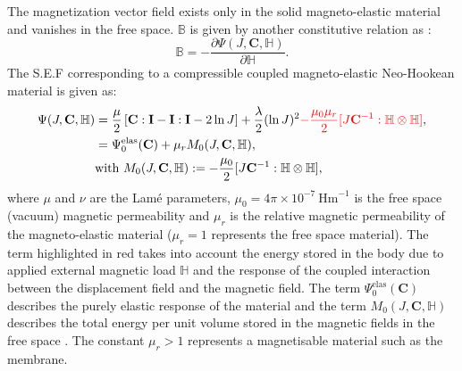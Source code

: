 \documentclass[11pt,a4paper,final]{article}
\begin{document}
The magnetization vector field exists only in the solid magneto-elastic material and vanishes in the free space. $\mathbb{B}$ is given by another constitutive relation as \cite{dorfmann2004}: 
\begin{equation}
\mathbb{B} = -\dfrac{\partial \Psi (J, \mathbf{C}, \mathbb{H})}{\partial \mathbb{H}}.
\label{eq:3.4}
\end{equation}
The S.E.F corresponding to a compressible coupled magneto-elastic Neo-Hookean material is given as: 
\begin{align}
\Psi (J, \mathbf{C}, \mathbb{H}) &= \dfrac{\mu}{2} \left[ \mathbf{C} : \mathbf{I} - \mathbf{I} : \mathbf{I} -2 \ln J \right] + \dfrac{\lambda}{2} (\ln J)^2 \textcolor{red}{- \frac{\mu_0 \mu_r}{2} [J \mathbf{C}^{-1} : \mathbb{H} \otimes \mathbb{H}]}, \\
&= \Psi_0^{\text{elas}} (\mathbf{C}) + \mu_r M_0 (J, \mathbf{C}, \mathbb{H}), \\
& \text{with} \ M_0 (J, \mathbf{C}, \mathbb{H}) := -\frac{\mu_0}{2} [J \mathbf{C}^{-1} : \mathbb{H} \otimes \mathbb{H}],
\label{eq:3.5}
\end{align}
where $\mu$ and $\nu$ are the Lam\'e parameters, $\mu_0 = 4 \pi \times 10^{-7} \ \text{Hm}^{-1}$ is the free space (vacuum) magnetic permeability and $\mu_r$ is the relative magnetic permeability of the magneto-elastic material ($\mu_r = 1$ represents the free space material). The term highlighted in red takes into account the energy stored in the body due to applied external magnetic load $\mathbb{H}$ and the response of the coupled interaction between the displacement field and the magnetic field. The term $\Psi_0^{\text{elas}} (\mathbf{C})$ describes the purely elastic response of the material and the term $M_0 (J, \mathbf{C}, \mathbb{H})$ describes the total energy per unit volume stored in the magnetic fields in the free space \cite{dorfmann2004}. The constant $\mu_r > 1$ represents a magnetisable material such as the membrane. \par 
\end{document}
